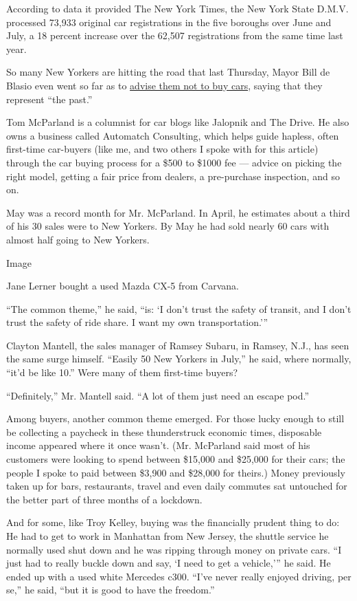 According to data it provided The New York Times, the New York State
D.M.V. processed 73,933 original car registrations in the five boroughs
over June and July, a 18 percent increase over the 62,507 registrations
from the same time last year.

So many New Yorkers are hitting the road that last Thursday, Mayor Bill
de Blasio even went so far as to
\href{https://twitter.com/danarubinstein/status/1291387068736851969}{advise
them not to buy cars}, saying that they represent ``the past.''

Tom McParland is a columnist for car blogs like Jalopnik and The Drive.
He also owns a business called Automatch Consulting, which helps guide
hapless, often first-time car-buyers (like me, and two others I spoke
with for this article) through the car buying process for a \$500 to
\$1000 fee --- advice on picking the right model, getting a fair price
from dealers, a pre-purchase inspection, and so on.

May was a record month for Mr. McParland. In April, he estimates about a
third of his 30 sales were to New Yorkers. By May he had sold nearly 60
cars with almost half going to New Yorkers.

Image

Jane Lerner bought a used Mazda CX-5 from Carvana.

``The common theme,'' he said, ``is: `I don't trust the safety of
transit, and I don't trust the safety of ride share. I want my own
transportation.'''

Clayton Mantell, the sales manager of Ramsey Subaru, in Ramsey, N.J.,
has seen the same surge himself. ``Easily 50 New Yorkers in July,'' he
said, where normally, ``it'd be like 10.'' Were many of them first-time
buyers?

``Definitely,'' Mr. Mantell said. ``A lot of them just need an escape
pod.''

Among buyers, another common theme emerged. For those lucky enough to
still be collecting a paycheck in these thunderstruck economic times,
disposable income appeared where it once wasn't. (Mr. McParland said
most of his customers were looking to spend between \$15,000 and
\$25,000 for their cars; the people I spoke to paid between \$3,900 and
\$28,000 for theirs.) Money previously taken up for bars, restaurants,
travel and even daily commutes sat untouched for the better part of
three months of a lockdown.

And for some, like Troy Kelley, buying was the financially prudent thing
to do: He had to get to work in Manhattan from New Jersey, the shuttle
service he normally used shut down and he was ripping through money on
private cars. ``I just had to really buckle down and say, `I need to get
a vehicle,''' he said. He ended up with a used white Mercedes c300.
``I've never really enjoyed driving, per se,'' he said, ``but it is good
to have the freedom.''

